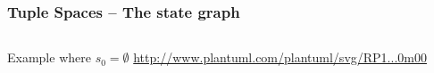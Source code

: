 \documentclass[presentation]{beamer}\mode<presentation>{\usetheme{AMSCesenaPurpleAndGold}}
\begin{document}
\begin{frame}
\frametitle{Tuple Spaces  -- The state graph}
    
    \begin{columns}
        \begin{column}{.75\linewidth}
            \begin{exampleblock}{Example where $s_0 = \emptyset$}
                \href{http://www.plantuml.com/plantuml/svg/RP1FJi905CRtSuhd2ZKXAGKs3K52mMYYa5XnWomczAaJfZFDp6iKZJjDN70HkOntu2IEJ6fgxAvvl-_FrnbOueQAJ3Ax4YhdXcSmmZjUI3hLYXBnZ1065PWG9zmZMai4GLoAfQrtJtY64El223JiGQG8cEMqXXJjqeYSX5QiuhG_qV3208PykRetkb1fhAKslTvCuLFklZ3jzs6DKkf7zihO_7W1pMOVRC2ysGOHx3xUcGtylHN1YIxea8vkrJo9pyQZsSLuKOeTtMq-QRVPCjloXZ22hpUdFPyauwlhNwKx4xEXrxYE0w5yPZoT9BDB5rd2q46JUZWTkf2R2coNSngrUnmcDt-xNzNOpsfxOwUkieJjkieITkj_g0D_7pMgT7f5zv_2RwC66w1AYqn-0m00}{http://www.plantuml.com/plantuml/svg/RP1...0m00}
            \end{exampleblock}
            
            \vfill
            

\end{column}
\end{columns}
\end{frame}
\end{document}

